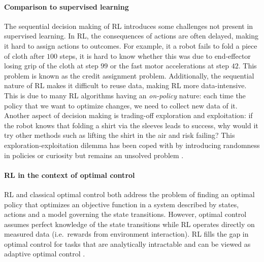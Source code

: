 \documentclass[\home/main.tex]{subfiles}
\begin{document}
\paragraph{Comparison to supervised learning}
The sequential decision making of RL introduces some challenges not present in supervised learning.
In RL, the consequences of actions are often delayed, making it hard to assign actions to outcomes. For example, it a robot fails to fold a piece of cloth after $100$ steps, it is hard to know whether this was due to end-effector losing grip of the cloth at step $99$ or the fast motor accelerations at step $42$. This problem is known as the credit assignment problem.
Additionally, the sequential nature of RL makes it difficult to reuse data, making RL more data-intensive. This is due to many RL algorithms having an \emph{on-policy} nature: each time the policy that we want to optimize changes, we need to collect new data of it.
Another aspect of decision making is trading-off exploration and exploitation: if the robot knows that folding a shirt via the sleeves leads to success, why would it try other methods such as lifting the shirt in the air and risk failing? This exploration-exploitation dilemma has been coped with by introducing randomness in policies or curiosity \autocite{pathak2017curiosity} but remains an unsolved problem \autocite{Sutton2018}.

\paragraph{RL in the context of optimal control}
\Gls{RL} and classical optimal control both address the problem of finding an optimal policy that optimizes an objective function in a system described by states, actions and a model governing the state transitions. However, optimal control assumes perfect knowledge of the state transitions while RL operates directly on measured data (i.e.\ rewards from environment interaction). RL fills the gap in optimal control for tasks that are analytically intractable and can be viewed as adaptive optimal control \autocite{sutton1992reinforcement}.
\end{document}
